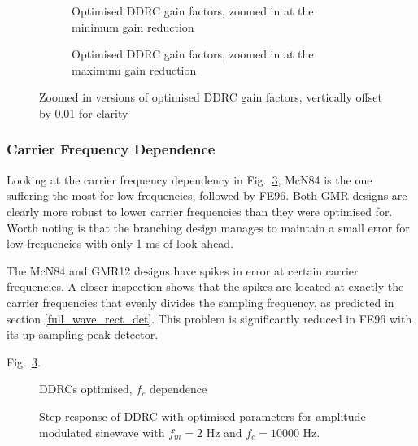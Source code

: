 \documentclass[../main2.tex]{subfiles}
\providecommand{\rootdir}{..}
\begin{document}
\begin{figure}
\captionsetup{justification=centering}
\begin{subfigure}{\linewidth}
\centering
\centerline{}
\caption{Optimised DDRC gain factors, zoomed in at the minimum gain reduction}
\end{subfigure}

\par\bigskip

\captionsetup{justification=centering}
\begin{subfigure}{\linewidth}
\centering
\centerline{}
\caption{Optimised DDRC gain factors, zoomed in at the maximum gain reduction}
\label{fig:complete_DDRC_opt_gain}
\end{subfigure}

\caption{Zoomed in versions of optimised DDRC gain factors, vertically offset by 0.01 for clarity}
\label{fig:peak_det_opt_env_zoom}
\end{figure}


\subsubsection{Carrier Frequency Dependence}
Looking at the carrier frequency dependency in Fig.~\ref{fig:complete_DDRC_opt_fc_dep}, McN84 is the one suffering the most for low frequencies, followed by FE96. Both GMR designs are clearly more robust to lower carrier frequencies than they were optimised for. Worth noting is that the branching design manages to maintain a small error for low frequencies with only 1 ms of look-ahead. 

The McN84 and GMR12 designs have spikes in error at certain carrier frequencies. A closer inspection shows that the spikes are located at exactly the carrier frequencies that evenly divides the sampling frequency, as predicted in section \ref{full_wave_rect_det}. This problem is significantly reduced in FE96 with its up-sampling peak detector.

Fig.~\ref{fig:complete_DDRC_opt_fc_dep}.

\begin{figure}[h]
\centerline{}
\caption{DDRCs optimised, $f_c$ dependence}
\label{fig:complete_DDRC_opt_fc_dep}
\end{figure}

\begin{figure}[h]
\centerline{}
\caption{Step response of DDRC with optimised parameters for amplitude modulated sinewave with $f_m=2$ Hz and $f_c=10000$ Hz.}
\label{fig:complete_DDRC_opt_step_response}
\end{figure}
\end{document}

